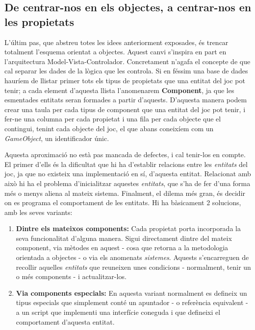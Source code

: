 \subsection{De centrar-nos en els objectes, a centrar-nos en les propietats}

L'últim pas, que abstreu totes les idees anteriorment exposades, és trencar totalment l'esquema orientat a objectes. Aquest canvi s'inspira en part en l'arquitectura Model-Vista-Controlador. Concretament n'agafa el concepte de que cal separar les dades de la lògica que les controla. Si en féssim una base de dades hauríem de llistar primer tots els tipus de propietats que una entitat del joc pot tenir; a cada element d'aquesta llista l'anomenarem {\bf Component}, ja que les esmentades entitats seran formades a partir d'aquests. D'aquesta manera podem crear una taula per cada tipus de component que una entitat del joc pot tenir, i fer-ne una columna per cada propietat i una fila per cada objecte que el contingui, tenint cada objecte del joc, el que abans coneixíem com un {\em GameObject}, un identificador únic.

Aquesta aproximació no està pas mancada de defectes, i cal tenir-los en compte. El primer d'ells és la dificultat que hi ha d'establir relacions entre les {\em entitats} del joc, ja que no existeix una implementació en sí, d'aquesta entitat. Relacionat amb això hi ha el problema d'inicialitzar aquestes {\em entitats}, que s'ha de fer d'una forma més o menys aliena al mateix sistema. Finalment, el dilema més gran, és decidir on es programa el comportament de les entitats. Hi ha bàsicament 2 solucions, amb les seves variants:

\begin{enumerate}
  \item {\bf Dintre els mateixos components:} Cada propietat porta incorporada la seva funcionalitat d'alguna manera. Sigui directament dintre del mateix component, via mètodes en aquest - cosa que retorna a la metodologia orientada a objectes - o via els anomenats {\em sistemes}. Aquests s'encarreguen de recollir aquelles {\em entitats} que reuneixen unes condicions - normalment, tenir un o més components - i actualitzar-los.
    
  \item {\bf Via components especials:} En aquesta variant normalment es defineix un tipus especials que simplement conté un apuntador - o referència equivalent - a un script que implementi una interfície coneguda i que defineixi el comportament d'aquesta entitat.
    
\end{enumerate}

